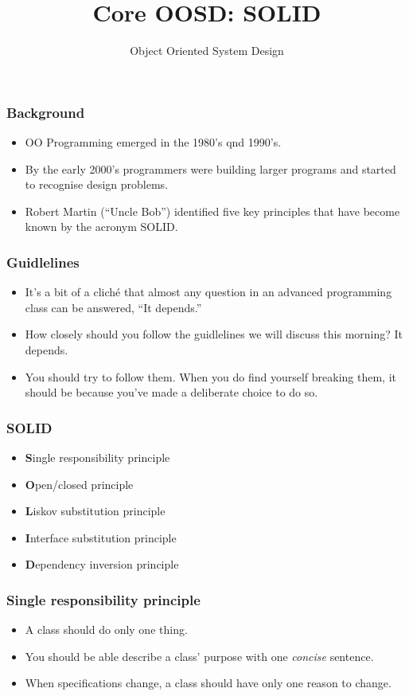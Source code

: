 \documentclass[10pt]{beamer}
\title{Core OOSD: SOLID}
\author[IN710]{Object Oriented System Design}
\institute[Otago Polytechnic]{
  Otago Polytechnic \\
  Dunedin, New Zealand \\
}
\date{}
\begin{document}
\begin{frame}[plain]
  \titlepage
\end{frame}

\begin{frame}
  \frametitle{Background}

 \begin{itemize}
  \item OO Programming emerged in the 1980's qnd 1990's.
  \item By the early 2000's programmers were building larger programs and started to recognise 
	  design problems.
  \item Robert Martin (``Uncle Bob'') identified five key principles that have become known
	  by the acronym SOLID.
  \end{itemize}
\end{frame}


\begin{frame}
	\frametitle{Guidlelines}

	\begin{itemize}
		\item It's a bit of a clich\'{e} that almost any question in an advanced
			programming class can be answered, ``It depends.''
		\item How closely should you follow the guidlelines we will discuss
			this morning?  It depends.
		\item You should try to follow them. When you do find yourself breaking them,
			it should be because you've made a deliberate choice to do so.
	\end{itemize}
\end{frame}

\begin{frame}
	\frametitle{SOLID}
	\begin{itemize}
		\item \textbf{S}ingle responsibility principle
		\item \textbf{O}pen/closed principle
		\item \textbf{L}iskov substitution principle
		\item \textbf{I}nterface substitution principle
		\item \textbf{D}ependency inversion principle
	\end{itemize}
\end{frame}

\begin{frame}
	\frametitle{Single responsibility principle}
	\begin{itemize}
		\item A class should do only one thing.
		\item You should be able describe a class' purpose with
			one \emph{concise} sentence.
		\item When specifications change, a class should have only
			one reason to change.
	\end{itemize}
\end{frame}
\end{document}
